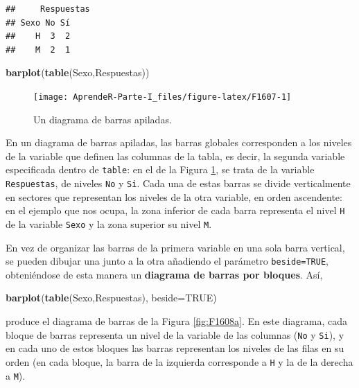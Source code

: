 \documentclass[]{book}
\newenvironment{Shaded}{\begin{snugshade}}{\end{snugshade}}
\newcommand{\DataTypeTok}[1]{\textcolor[rgb]{0.13,0.29,0.53}{#1}}
\newcommand{\KeywordTok}[1]{\textcolor[rgb]{0.13,0.29,0.53}{\textbf{#1}}}
\newcommand{\NormalTok}[1]{#1}
\newcommand{\OtherTok}[1]{\textcolor[rgb]{0.56,0.35,0.01}{#1}}
\theoremstyle{definition}
\theoremstyle{definition}
\theoremstyle{definition}
\theoremstyle{remark}
\begin{document}
\begin{verbatim}
##     Respuestas
## Sexo No Sí
##    H  3  2
##    M  2  1
\end{verbatim}

\begin{Shaded}
\begin{Highlighting}[]
\KeywordTok{barplot}\NormalTok{(}\KeywordTok{table}\NormalTok{(Sexo,Respuestas))}
\end{Highlighting}
\end{Shaded}

\begin{figure}

{\centering \texttt{[image: AprendeR-Parte-I\_files/figure-latex/F1607-1]} 

}

\caption{Un diagrama de barras apiladas.}\label{fig:F1607}
\end{figure}

En un diagrama de barras apiladas, las barras globales corresponden a los niveles de la variable que definen las columnas de la tabla, es decir, la segunda variable especificada dentro de \texttt{table}: en el de la Figura \ref{fig:F1607}, se trata de la variable \texttt{Respuestas}, de niveles \texttt{No} y \texttt{Si}. Cada una de estas barras se divide verticalmente en sectores que representan los niveles de la otra variable, en orden ascendente: en el ejemplo que nos ocupa, la zona inferior de cada barra representa el nivel \texttt{H} de la variable \texttt{Sexo} y la zona superior su nivel \texttt{M}.

En vez de organizar las barras de la primera variable en una sola barra vertical, se pueden dibujar una junto a la otra añadiendo el parámetro \texttt{beside=TRUE}, obteniéndose de esta manera un \textbf{diagrama de barras por bloques}. Así,

\begin{Shaded}
\begin{Highlighting}[]
\KeywordTok{barplot}\NormalTok{(}\KeywordTok{table}\NormalTok{(Sexo,Respuestas), }\DataTypeTok{beside=}\OtherTok{TRUE}\NormalTok{)}
\end{Highlighting}
\end{Shaded}

produce el diagrama de barras de la Figura \ref{fig:F1608a}.
En este diagrama, cada bloque de barras representa un nivel de la variable de las columnas (\texttt{No} y \texttt{Si}), y en cada uno de estos bloques las barras representan los niveles de las filas en su orden (en cada bloque, la barra de la izquierda corresponde a \texttt{H} y la de la derecha a \texttt{M}).
\end{document}
